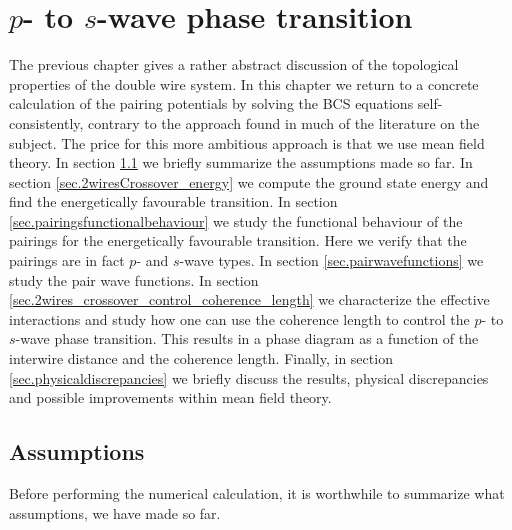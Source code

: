 \chapter{\texorpdfstring{$p$}{p}- to \texorpdfstring{$s$}{s}-wave phase transition} %

\label{Chapter6} 

The previous chapter gives a rather abstract discussion of the topological properties of the double wire system. In this chapter we return to a concrete calculation of the pairing potentials by solving the BCS equations self-consistently, contrary to the approach found in much of the literature on the subject. The price for this more ambitious approach is that we use mean field theory. In section \ref{sec.assumptions} we briefly summarize the assumptions made so far. In section \ref{sec.2wiresCrossover_energy} we compute the ground state energy and find the energetically favourable transition. In section \ref{sec.pairingsfunctionalbehaviour} we study the functional behaviour of the pairings for the energetically favourable transition. Here we verify that the pairings are in fact $p$- and $s$-wave types. In section \ref{sec.pairwavefunctions} we study the pair wave functions. In section \ref{sec.2wires_crossover_control_coherence_length} we characterize the effective interactions and study how one can use the coherence length to control the $p$- to $s$-wave phase transition. This results in a phase diagram as a function of the interwire distance and the coherence length. Finally, in section \ref{sec.physicaldiscrepancies} we briefly discuss the results, physical discrepancies and possible improvements within mean field theory.

\section{Assumptions} \label{sec.assumptions}
Before performing the numerical calculation, it is worthwhile to summarize what assumptions, we have made so far. 

